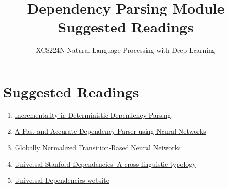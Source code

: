 \documentclass{article}
\title{Dependency Parsing Module Suggested Readings}
\author{XCS224N Natural Language Processing with Deep Learning}
\date{}
\begin{document}
\maketitle

\section{Suggested Readings}
\begin{enumerate}
    \item \href{https://www.aclweb.org/anthology/W04-0308.pdf}{Incrementality in Deterministic Dependency Parsing}
    \item \href{https://www.emnlp2014.org/papers/pdf/EMNLP2014082.pdf}{A Fast and Accurate Dependency Parser using Neural Networks}
    \item \href{https://arxiv.org/pdf/1603.06042.pdf}{Globally Normalized Transition-Based Neural Networks}
    \item \href{https://nlp.stanford.edu/~manning/papers/USD_LREC14_UD_revision.pdf}{Universal Stanford Dependencies: A cross-linguistic typology}
    \item \href{https://universaldependencies.org/}{Universal Dependencies website}
\end{enumerate}
\end{document}
